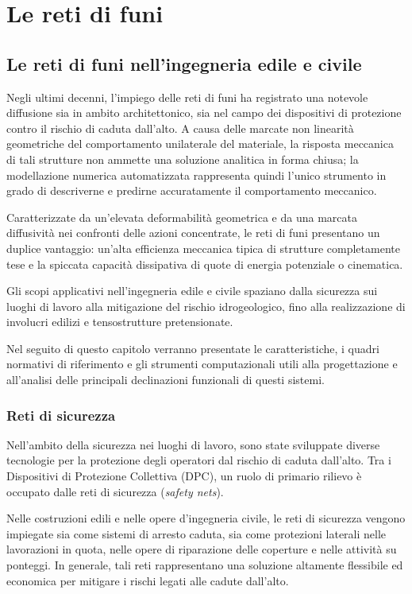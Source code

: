 \chapter{Le reti di funi}\label{chap:capitolo1}

\section{Le reti di funi nell'ingegneria edile e civile}\label{chap:capitolo11}
Negli ultimi decenni, l'impiego delle reti di funi ha registrato una notevole diffusione sia in ambito architettonico, sia nel campo dei dispositivi di protezione contro il rischio di caduta dall'alto. A causa delle marcate non linearità geometriche del comportamento unilaterale del materiale, la risposta meccanica di tali strutture non ammette una soluzione analitica in forma chiusa; la modellazione numerica automatizzata rappresenta quindi l'unico strumento in grado di descriverne e predirne accuratamente il comportamento meccanico.

Caratterizzate da un'elevata deformabilità geometrica e da una marcata diffusività nei confronti delle azioni concentrate, le reti di funi presentano un duplice vantaggio: un'alta efficienza meccanica tipica di strutture completamente tese e la spiccata capacità dissipativa di quote di energia potenziale o cinematica. 

Gli scopi applicativi nell'ingegneria edile e civile spaziano dalla sicurezza sui luoghi di lavoro alla mitigazione del rischio idrogeologico, fino alla realizzazione di involucri edilizi e tensostrutture pretensionate. 

Nel seguito di questo capitolo verranno presentate le caratteristiche, i quadri normativi di riferimento e gli strumenti computazionali utili alla progettazione e all'analisi delle principali declinazioni funzionali di questi sistemi. 

\subsection{Reti di sicurezza}
Nell'ambito della sicurezza nei luoghi di lavoro, sono state sviluppate diverse tecnologie per la protezione degli operatori dal rischio di caduta dall'alto. Tra i Dispositivi di Protezione Collettiva (DPC), un ruolo di primario rilievo è occupato dalle reti di sicurezza (\textit{safety nets}). 

Nelle costruzioni edili e nelle opere d'ingegneria civile, le reti di sicurezza vengono impiegate sia come sistemi di arresto caduta, sia come protezioni laterali nelle lavorazioni in quota, nelle opere di riparazione delle coperture e nelle attività su ponteggi. In generale, tali reti rappresentano una soluzione altamente flessibile ed economica per mitigare i rischi legati alle cadute dall'alto. 

